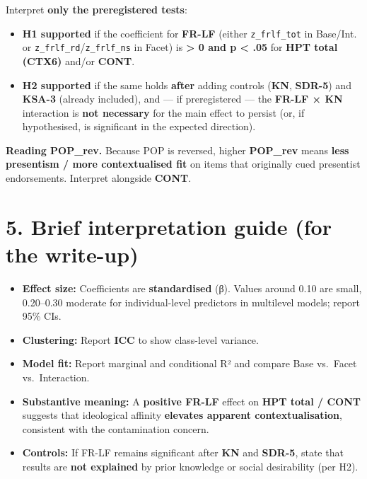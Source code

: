 \documentclass[
  10pt,
]{article}
\providecommand{\tightlist}{%
  \setlength{\itemsep}{0pt}\setlength{\parskip}{0pt}}
\begin{document}
Interpret \textbf{only the preregistered tests}:

\begin{itemize}
\tightlist
\item
  \textbf{H1 supported} if the coefficient for \textbf{FR-LF} (either
  \texttt{z\_frlf\_tot} in Base/Int. or
  \texttt{z\_frlf\_rd}/\texttt{z\_frlf\_ns} in Facet) is
  \textbf{\textgreater{} 0 and p \textless{} .05} for \textbf{HPT total
  (CTX6)} and/or \textbf{CONT}.
\item
  \textbf{H2 supported} if the same holds \textbf{after} adding controls
  (\textbf{KN}, \textbf{SDR-5}) and \textbf{KSA-3} (already included),
  and --- if preregistered --- the \textbf{FR-LF × KN} interaction is
  \textbf{not necessary} for the main effect to persist (or, if
  hypothesised, is significant in the expected direction).
\end{itemize}

\textbf{Reading POP\_rev.} Because POP is reversed, higher
\textbf{POP\_rev} means \textbf{less presentism / more contextualised
fit} on items that originally cued presentist endorsements. Interpret
alongside \textbf{CONT}.

\hypertarget{brief-interpretation-guide-for-the-write-up}{%
\section{5. Brief interpretation guide (for the
write-up)}\label{brief-interpretation-guide-for-the-write-up}}

\begin{itemize}
\tightlist
\item
  \textbf{Effect size:} Coefficients are \textbf{standardised} (β).
  Values around 0.10 are small, 0.20--0.30 moderate for individual-level
  predictors in multilevel models; report 95\% CIs.
\item
  \textbf{Clustering:} Report \textbf{ICC} to show class-level variance.
\item
  \textbf{Model fit:} Report marginal and conditional R² and compare
  Base vs.~Facet vs.~Interaction.
\item
  \textbf{Substantive meaning:} A \textbf{positive FR-LF} effect on
  \textbf{HPT total / CONT} suggests that ideological affinity
  \textbf{elevates apparent contextualisation}, consistent with the
  contamination concern.
\item
  \textbf{Controls:} If FR-LF remains significant after \textbf{KN} and
  \textbf{SDR-5}, state that results are \textbf{not explained} by prior
  knowledge or social desirability (per H2).
\end{itemize}
\end{document}
